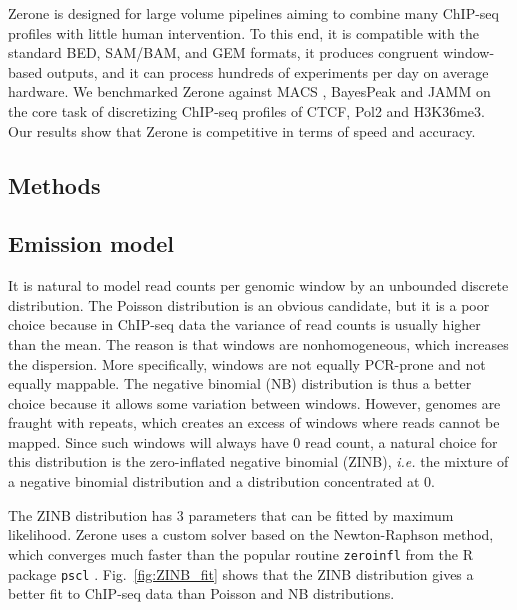 \documentclass{bioinfo}
\begin{document}
Zerone is designed for large volume pipelines aiming to combine many
ChIP-seq profiles with little human intervention. To this end, it is
compatible with the standard BED, SAM/BAM, and GEM formats,
it produces congruent window-based outputs, and it can process hundreds
of experiments per day on average hardware. We benchmarked Zerone against
MACS \citep{pmid18798982}, BayesPeak \citep{pmid19772557} and
JAMM \citep{pmid25223640} on the core task of discretizing ChIP-seq
profiles of CTCF, Pol2 and H3K36me3. Our results show that Zerone is
competitive in terms of speed and accuracy.
\begin{methods}
\section{Methods}

\subsection{Emission model}
\label{sub:emissions}
It is natural to model read counts per genomic window by an unbounded
discrete distribution. The Poisson distribution is an obvious candidate,
but it is a poor choice because in ChIP-seq data the variance of read
counts is usually higher than the mean. The reason is that windows
are nonhomogeneous, which increases the dispersion. More specifically, windows
are not equally PCR-prone and not equally mappable. The negative binomial
(NB) distribution is thus a better choice because it allows some variation
between windows. However, genomes are fraught with repeats, which creates
an excess of windows where reads cannot be mapped. Since such windows
will always have 0 read count, a natural choice for this distribution is
the zero-inflated negative binomial (ZINB), \textit{i.e.} the mixture of
a negative binomial distribution and a distribution concentrated at 0.

The ZINB distribution has 3 parameters that can be fitted by maximum
likelihood. Zerone uses a custom solver based on the Newton-Raphson
method, which converges much faster than the popular routine
\texttt{zeroinfl} \citep{psclb} from the R \citep{R} package \texttt{pscl}
\citep{pscla}.
Fig.~\ref{fig:ZINB_fit} shows that the ZINB distribution gives a better
fit to ChIP-seq data than Poisson and NB distributions.


\end{methods}
\end{document}
